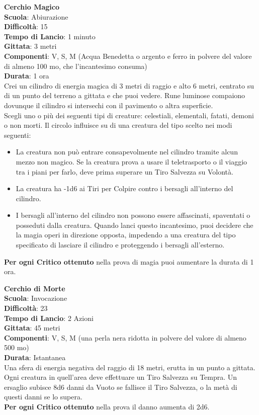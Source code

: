 \begin{multicols}{2}
\medskip\textbf{Cerchio Magico}\\
\textbf{Scuola}: Abiurazione\\
\textbf{Difficoltà}:  15\\
\textbf{Tempo di Lancio}: 1 minuto\\
\textbf{Gittata}: 3 metri\\
\textbf{Componenti}: V, S, M (Acqua Benedetta o argento e ferro in polvere del valore di almeno 100 mo, che l'incantesimo consuma)\\
\textbf{Durata}: 1 ora\\
Crei un cilindro di energia magica di 3 metri di raggio e alto 6 metri, centrato su di un punto del terreno a gittata e che puoi vedere. Rune luminose compaiono dovunque il cilindro si intersechi con il pavimento o altra superficie.\\
Scegli uno o più dei seguenti tipi di creature: celestiali, elementali, fatati, demoni o non morti. Il circolo influisce su di una creatura del tipo scelto nei modi seguenti:\\
\begin{itemize}
	\item 
La creatura non può entrare consapevolmente nel cilindro tramite alcun mezzo non magico. Se la creatura prova a usare il teletrasporto o il viaggio tra i piani per farlo, deve prima superare un Tiro Salvezza su Volontà.
	\item 
La creatura ha -1d6 ai Tiri per Colpire contro i bersagli all'interno del cilindro.
	\item 
I bersagli all'interno del cilindro non possono essere affascinati, spaventati o posseduti dalla creatura. Quando lanci questo incantesimo, puoi decidere che la magia operi in direzione opposta, impedendo a una creatura del tipo specificato di lasciare il cilindro e proteggendo i bersagli all'esterno.
\end{itemize}
\textbf{Per ogni Critico ottenuto} nella prova di magia puoi aumentare la durata di 1 ora.

\medskip\textbf{Cerchio di Morte}\\
\textbf{Scuola}: Invocazione\\
\textbf{Difficoltà}:  23\\
\textbf{Tempo di Lancio}: 2 Azioni\\
\textbf{Gittata}: 45 metri\\
\textbf{Componenti}: V, S, M (una perla nera ridotta in polvere del valore di almeno 500 mo)\\
\textbf{Durata}: Istantanea\\
Una sfera di energia negativa del raggio di 18 metri, erutta in un punto a gittata. Ogni creatura in quell'area deve effettuare un Tiro Salvezza su Tempra. Un  ersaglio subisce 8d6 danni da Vuoto se fallisce il Tiro Salvezza, o la metà di questi danni se lo supera. \\
\textbf{Per ogni Critico ottenuto} nella prova il danno aumenta di 2d6.


\end{multicols}
